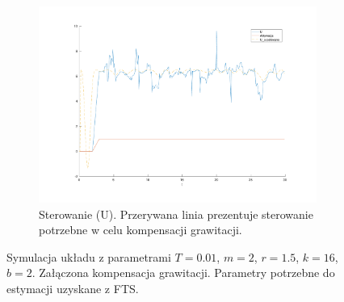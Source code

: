 \documentclass[a4paper, 10pt]{article}
\begin{document}
\begin{figure}
	\begin{subfigure}{.5\textwidth}
		\centering
		\includegraphics[width=\linewidth]{kompensacja_u}
		\caption{Sterowanie (U). Przerywana linia prezentuje sterowanie potrzebne w celu kompensacji grawitacji.}
		\label{fig:kompensacja_u}
	\end{subfigure}
	
	\caption{Symulacja układu z parametrami $T=0.01$, $m = 2$, $r = 1.5$, $k = 16$, $b = 2$. Załączona kompensacja grawitacji. Parametry potrzebne do estymacji uzyskane z FTS.}
	\label{fig:kompensacja}
\end{figure}
\end{document}
